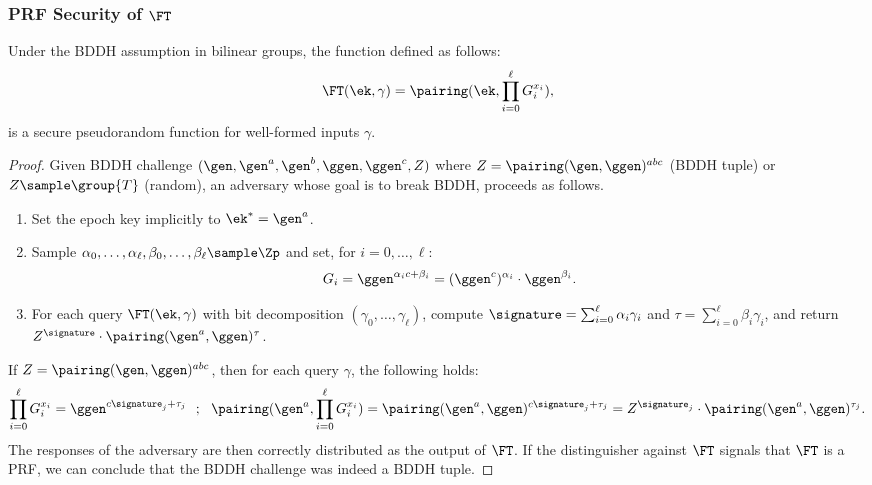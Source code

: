 \subsubsection*{PRF Security of $\FT$}\label{sec:txid-ft-prf-proof}

\begin{lemma}\label{lem:txid-ft-prf} Under the BDDH assumption in bilinear
  groups, the function defined as follows:
%
  \begin{equation*}
%
    \FT(\ek, \gamma) = \pairing(\ek, \prod_{i=0}^\ell G_i^{x_i}),
%
  \end{equation*}
%
is a secure pseudorandom function for well-formed inputs $\gamma$.  \end{lemma}

\begin{proof}

  Given BDDH challenge $(\gen, \gen^a, \gen^b, \ggen, \ggen^c, Z)$ where $Z =
  \pairing(\gen, \ggen)^{abc}$ (BDDH tuple) or $Z \sample \group{T}$ (random),
  an adversary whose goal is to break BDDH, proceeds as follows.

  \begin{enumerate}

    \item Set the epoch key implicitly to $\ek^* = \gen^a$.

    \item Sample $\alpha_0, \ldots, \alpha_{\ell}, \beta_0, \ldots,
      \beta_{\ell} \sample \Zp$ and set, for $i = 0, \ldots, \ell$:
%
      \begin{equation*}
%
        G_i = \ggen^{\alpha_i c + \beta_i} = (\ggen^c)^{\alpha_i} \cdot
        \ggen^{\beta_i}.
%
      \end{equation*}
%

    \item For each query $\FT(\ek, \gamma)$ with bit decomposition $(\gamma_0,
      \ldots, \gamma_\ell)$, compute $\signature = \sum_{i=0}^\ell \alpha_i
      \gamma_i$ and $\tau = \sum_{i=0}^\ell \beta_i \gamma_i$, and return
      $Z^{\signature} \cdot \pairing(\gen^a, \ggen)^{\tau}$.

  \end{enumerate}

  If $Z = \pairing(\gen, \ggen)^{abc}$, then for each query $\gamma$, the
  following holds:
%
  \begin{equation*}
%
    \prod_{i=0}^\ell G_i^{x_i} = \ggen^{c\signature_j + \tau_j} \ \ ; \ \
    \pairing(\gen^a, \prod_{i=0}^\ell G_i^{x_i}) = \pairing(\gen^a,
    \ggen)^{c\signature_j + \tau_j} = Z^{\signature_j} \cdot \pairing(\gen^a,
    \ggen)^{\tau_j}.
%
  \end{equation*}
%
  The responses of the adversary are then correctly distributed as the output
  of $\FT$. If the distinguisher against $\FT$ signals that $\FT$ is a PRF, we
  can conclude that the BDDH challenge was indeed a BDDH tuple.


\end{proof}

